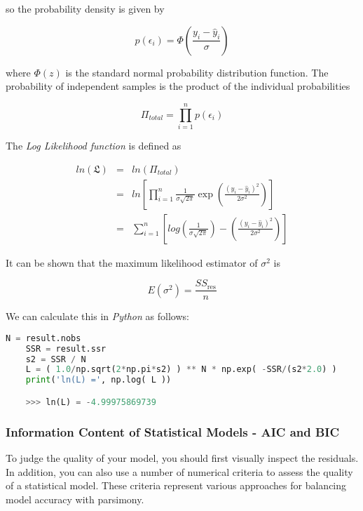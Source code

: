 so the probability density is given by

\begin{equation}
  p(\epsilon_i) =  \Phi (\frac{y_i - \hat{y}_i}{\sigma})
\end{equation}

where $\Phi(z)$ is the standard normal probability distribution function. The probability of independent samples is the product of the individual probabilities

\begin{equation}
  \Pi_{total} = \prod_{i=1}^n p(\epsilon_i)
\end{equation}

The \emph{Log Likelihood function}  is defined as

\begin{eqnarray*}
  ln(\mathfrak{L}) &=& ln(\Pi_{total}) \\
  &=& ln\left[\prod_{i=1}^n \frac{1}{\sigma\sqrt{2 \pi}} \exp \left(\frac{(y_i - \hat{y}_i)^2}{2 \sigma^2}\right)\right] \\
  &=& \sum_{i=1}^n\left[log\left(\frac{1}{\sigma \sqrt{2 \pi}}\right)- \left(\frac{(y_i - \hat{y}_i)^2}{2 \sigma^2}\right)\right]
\end{eqnarray*}

It can be shown that the maximum likelihood estimator of $\sigma^2$ is

\begin{equation}
  E(\sigma^2) = \frac{SS_\text{res}}{n}
\end{equation}

We can calculate this in \emph{Python} as follows:

\begin{lstlisting}[language=Python]
    N = result.nobs
    SSR = result.ssr
    s2 = SSR / N
    L = ( 1.0/np.sqrt(2*np.pi*s2) ) ** N * np.exp( -SSR/(s2*2.0) )
    print('ln(L) =', np.log( L ))

    >>> ln(L) = -4.99975869739

\end{lstlisting}


\subsubsection{Information Content of Statistical Models - AIC and BIC}

To judge the quality of your model, you should first visually inspect the residuals. In addition, you can also use a number of numerical criteria to assess the quality of a statistical model. These criteria represent various approaches for balancing model accuracy with parsimony.

